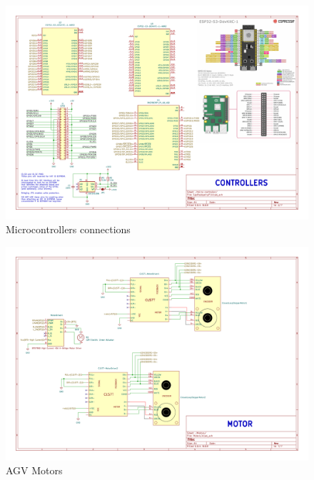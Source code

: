 \documentclass[../../main]{subfiles}
\begin{document}
\begin{figure}[p] %
    \centering
    \includegraphics[width=0.98\textheight,angle=90]{fig/agv_wire-micro controller.pdf}
    \caption{Microcontrollers connections }
\end{figure}

\newpage

\begin{figure}[p] %
    \centering
    \includegraphics[width=0.98\textheight,angle=90]{fig/agv_wire-Motors.pdf}
    \caption{AGV Motors}
\end{figure}

\newpage
\end{document}
